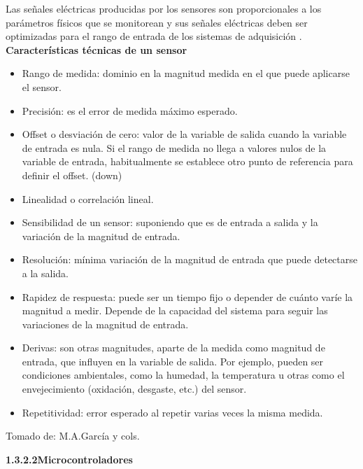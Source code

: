     Las señales eléctricas producidas por los sensores son proporcionales a los parámetros físicos que se monitorean y sus señales eléctricas deben ser optimizadas para el rango de entrada de los sistemas de adquisición \cite{nationalInstrument}.\\

    \textbf{Características técnicas de un sensor}
    \begin{itemize}
        \item Rango de medida: dominio en la magnitud medida en el que puede aplicarse el sensor.
        \item Precisión: es el error de medida máximo esperado.
        \item Offset o desviación de cero: valor de la variable de salida cuando la variable de entrada es nula. Si el rango de medida no llega a valores nulos de la variable de entrada, habitualmente se establece otro punto de referencia para definir el offset. (down)
        \item Linealidad o correlación lineal.
        \item Sensibilidad de un sensor: suponiendo que es de entrada a salida y la variación de la magnitud de entrada.
        \item Resolución: mínima variación de la magnitud de entrada que puede detectarse a la salida.
        \item Rapidez de respuesta: puede ser un tiempo fijo o depender de cuánto varíe la magnitud a medir. Depende de la capacidad del sistema para seguir las variaciones de la magnitud de entrada.
        \item Derivas: son otras magnitudes, aparte de la medida como magnitud de entrada, que influyen en la variable de salida. Por ejemplo, pueden ser condiciones ambientales, como la humedad, la temperatura u otras como el envejecimiento (oxidación, desgaste, etc.) del sensor.
        \item Repetitividad: error esperado al repetir varias veces la misma medida.
    \end{itemize}

    Tomado de: M.A.García y cols.\cite{caracteristicassensores}

    \newpage

    \textbf{1.3.2.2\hspace{5mm}Microcontroladores}

